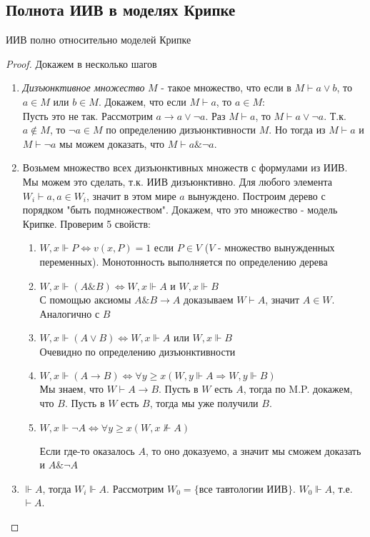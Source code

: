 \subsection{Полнота ИИВ в моделях Крипке}
\begin{theorem}
ИИВ полно относительно моделей Крипке
\end{theorem}
\begin{proof}
Докажем в несколько шагов
\begin{enumerate}
\item \emph{Дизъюнктивное множество} $M$ - такое множество, что если в $M \vdash a \vee b$, то $a \in M$ или $b \in M$. Докажем, что если $M \vdash a$, то $a \in M$:\\
Пусть это не так. Рассмотрим $a \rightarrow a \vee \neg a$. Раз $M \vdash a$, то $M \vdash a \vee \neg a$. Т.к. $a \not \in M$, то $\neg a \in M$ по определению дизъюнктивности $M$. Но тогда из $M \vdash a$ и $M \vdash \neg a$ мы можем доказать, что $M \vdash a \& \neg a$.
\item Возьмем множество всех дизъюнктивных множеств с формулами из ИИВ. Мы можем это сделать, т.к. ИИВ дизъюнктивно. Для любого элемента $W_{i} \vdash a, a \in W_{i}$, значит в этом мире $a$ вынуждено. Построим дерево с порядком "быть подмножеством". Докажем, что это множество - модель Крипке. Проверим 5 свойств:
\begin{enumerate}
\item $W, x \Vdash P \Leftrightarrow v(x, P) = 1$ если $P \in V$ ($V$ - множество вынужденных переменных). Монотонность выполняется по определению дерева
\item $W, x \Vdash (A \& B) \Leftrightarrow W, x \Vdash A$ и $W, x \Vdash B$\\
С помощью аксиомы $A \& B \rightarrow A$ доказываем $W \vdash A$, значит $A \in W$. Аналогично с $B$ 
\item $W, x \Vdash (A \vee B) \Leftrightarrow W, x \Vdash A$ или $W, x \Vdash B$\\
Очевидно по определению дизъюнктивности
\item $W, x \Vdash (A \rightarrow B) \Leftrightarrow \forall y \geq x (W, y \Vdash A \Rightarrow W, y \Vdash B)$\\
Мы знаем, что $W \vdash A \rightarrow B$. Пусть в $W$ есть $A$, тогда по M.P. докажем, что $B$. Пусть в $W$ есть $B$, тогда мы уже получили $B$.
\item $W, x \Vdash \neg A \Leftrightarrow \forall y \geq x (W, x \not \Vdash A)$

Если где-то оказалось $A$, то оно доказуемо, а значит мы сможем доказать и $A \& \neg A$ 
\end{enumerate}
\item $\Vdash A$, тогда $W_{i} \Vdash A$. Рассмотрим $W_{0} = \lbrace$все тавтологии ИИВ$\rbrace$. $W_{0} \Vdash A$, т.е. $\vdash A$.
\end{enumerate}
\end{proof}

